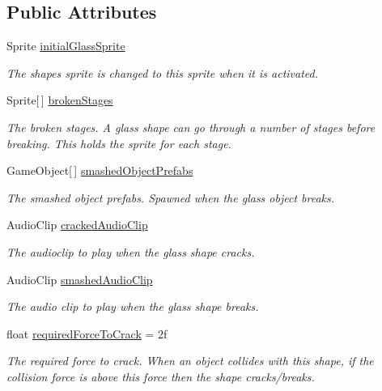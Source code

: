 \subsection*{Public Attributes}
\begin{DoxyCompactItemize}
\item 
Sprite \hyperlink{class_multi_stack_1_1_glass_object_a9ef4bb35966c6cb6861b70ee178e5074}{initial\+Glass\+Sprite}
\begin{DoxyCompactList}\small\item\em The shapes sprite is changed to this sprite when it is activated. \end{DoxyCompactList}\item 
Sprite\mbox{[}$\,$\mbox{]} \hyperlink{class_multi_stack_1_1_glass_object_a3f4a1945cc951946fa2cb0c7273f63b1}{broken\+Stages}
\begin{DoxyCompactList}\small\item\em The broken stages. A glass shape can go through a number of stages before breaking. This holds the sprite for each stage. \end{DoxyCompactList}\item 
Game\+Object\mbox{[}$\,$\mbox{]} \hyperlink{class_multi_stack_1_1_glass_object_af62687ae4ee9848946633a1fb5e0a4ff}{smashed\+Object\+Prefabs}
\begin{DoxyCompactList}\small\item\em The smashed object prefabs. Spawned when the glass object breaks. \end{DoxyCompactList}\item 
Audio\+Clip \hyperlink{class_multi_stack_1_1_glass_object_a371c5cf69b11f23d2da81a3e819d6bf8}{cracked\+Audio\+Clip}
\begin{DoxyCompactList}\small\item\em The audioclip to play when the glass shape cracks. \end{DoxyCompactList}\item 
Audio\+Clip \hyperlink{class_multi_stack_1_1_glass_object_a0ffbf8da1d39767934eb87e8a2ee6710}{smashed\+Audio\+Clip}
\begin{DoxyCompactList}\small\item\em The audio clip to play when the glass shape breaks. \end{DoxyCompactList}\item 
float \hyperlink{class_multi_stack_1_1_glass_object_ae9c87a466956cd98113e0b17ad11bcd5}{required\+Force\+To\+Crack} = 2f
\begin{DoxyCompactList}\small\item\em The required force to crack. When an object collides with this shape, if the collision force is above this force then the shape cracks/breaks. \end{DoxyCompactList}\item 

\end{DoxyCompactItemize}
